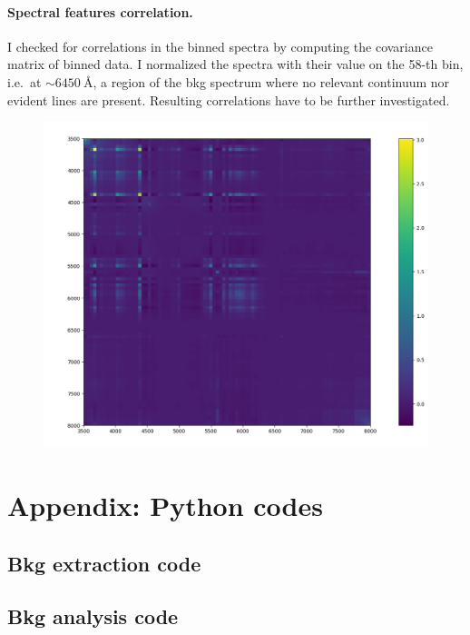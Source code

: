 \documentclass{article}
\begin{document}
\paragraph{Spectral features correlation.} I checked for correlations in the binned spectra by computing the covariance matrix of binned data. I normalized the spectra with their value on the 58-th bin, i.e.\ at $\sim\SI{6450}{\angstrom}$, a region of the bkg spectrum where no relevant continuum nor evident lines are present.  Resulting correlations have to be further investigated.
	\begin{figure}[h!]
	\centering
	\includegraphics[width=.75\textwidth]{../covariance}
\end{figure}

\newpage
\section{Appendix: Python codes}
\subsection{Bkg extraction code}

\subsection{Bkg analysis code}

\end{document}

